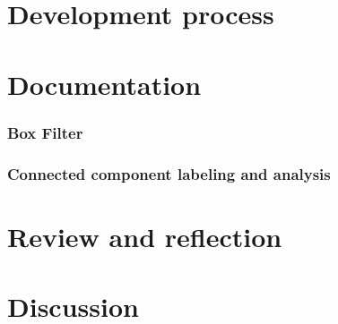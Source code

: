 \documentclass[12pt]{report}
\begin{document}
\chapter{Development process}

\chapter{Documentation}

\subsection{Box Filter}
\subsection{Connected component labeling and analysis}

\chapter{Review and reflection}

\chapter{Discussion}




\end{document}
